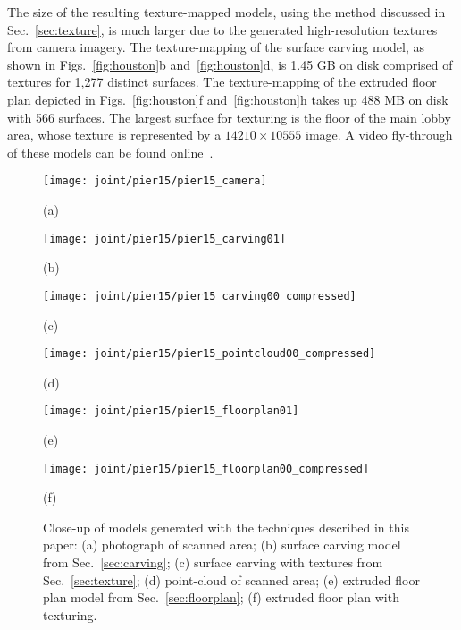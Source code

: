 \documentclass[10pt,twocolumn,twoside]{IEEEtran}
\begin{document}
The size of the resulting texture-mapped models, using the method discussed in Sec.~\ref{sec:texture}, is much larger due to the generated high-resolution textures from camera imagery.  The texture-mapping of the surface carving model, as shown in Figs.~\ref{fig:houston}b and~\ref{fig:houston}d, is 1.45 GB on disk comprised of textures for 1,277 distinct surfaces.  The texture-mapping of the extruded floor plan depicted in Figs.~\ref{fig:houston}f and~\ref{fig:houston}h takes up 488 MB on disk with 566 surfaces.  The largest surface for texturing is the floor of the main lobby area, whose texture is represented by a $14210 \times 10555$ image.  A video fly-through of these models can be found online~\cite{video}.

\begin{figure*}[t]

	\begin{minipage}[t]{0.30\linewidth}
		\centerline{\texttt{[image: joint/pier15/pier15\_camera]}}
		\centerline{(a)}\medskip
	\end{minipage}
	\hfill
	\begin{minipage}[t]{0.30\linewidth}
		\centerline{\texttt{[image: joint/pier15/pier15\_carving01]}}
		\centerline{(b)}\medskip
	\end{minipage}
	\hfill
	\begin{minipage}[t]{0.30\linewidth}
		\centerline{\texttt{[image: joint/pier15/pier15\_carving00\_compressed]}}
		\centerline{(c)}\medskip
	\end{minipage}
	
	\begin{minipage}[b]{0.30\linewidth}
		\centerline{\texttt{[image: joint/pier15/pier15\_pointcloud00\_compressed]}}
		\centerline{(d)}\medskip
	\end{minipage}
	\hfill
	\begin{minipage}[b]{0.30\linewidth}
		\centerline{\texttt{[image: joint/pier15/pier15\_floorplan01]}}
		\centerline{(e)}\medskip
	\end{minipage}
	\hfill
	\begin{minipage}[b]{0.30\linewidth}
		\centerline{\texttt{[image: joint/pier15/pier15\_floorplan00\_compressed]}}
		\centerline{(f)}\medskip
	\end{minipage}
	
	\caption{Close-up of models generated with the techniques described in this paper:  (a) photograph of scanned area; (b) surface carving model from Sec.~\ref{sec:carving}; (c) surface carving with textures from Sec.~\ref{sec:texture}; (d) point-cloud of scanned area; (e) extruded floor plan model from Sec.~\ref{sec:floorplan}; (f) extruded floor plan with texturing.}
	\label{fig:pier15}

\end{figure*}
\end{document}
